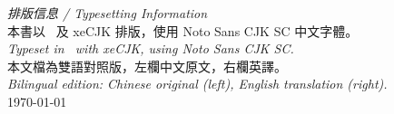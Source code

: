 \documentclass[11pt,a4paper]{article}
\begin{document}
\vspace{0.5cm}

\begin{center}
\begin{minipage}{0.8\textwidth}
\centering
\textit{排版信息 / Typesetting Information}\\[0.3cm]
{\small 本書以 \XeLaTeX\ 及 xeCJK 排版，使用 Noto Sans CJK SC 中文字體。\\
\textit{Typeset in \XeLaTeX\ with xeCJK, using Noto Sans CJK SC.}\\[0.2cm]
本文檔為雙語對照版，左欄中文原文，右欄英譯。\\
\textit{Bilingual edition: Chinese original (left), English translation (right).}\\[0.2cm]
\today}
\end{minipage}
\end{center}
\end{document}
